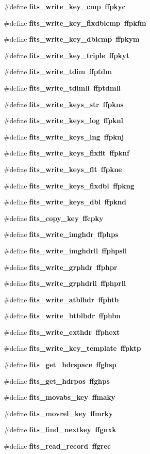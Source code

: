 \begin{CompactItemize}
\#define \bf{fits\_\-write\_\-key\_\-cmp}~ffpkyc
\item 
\#define \bf{fits\_\-write\_\-key\_\-fixdblcmp}~ffpkfm
\item 
\#define \bf{fits\_\-write\_\-key\_\-dblcmp}~ffpkym
\item 
\#define \bf{fits\_\-write\_\-key\_\-triple}~ffpkyt
\item 
\#define \bf{fits\_\-write\_\-tdim}~ffptdm
\item 
\#define \bf{fits\_\-write\_\-tdimll}~ffptdmll
\item 
\#define \bf{fits\_\-write\_\-keys\_\-str}~ffpkns
\item 
\#define \bf{fits\_\-write\_\-keys\_\-log}~ffpknl
\item 
\#define \bf{fits\_\-write\_\-keys\_\-lng}~ffpknj
\item 
\#define \bf{fits\_\-write\_\-keys\_\-fixflt}~ffpknf
\item 
\#define \bf{fits\_\-write\_\-keys\_\-flt}~ffpkne
\item 
\#define \bf{fits\_\-write\_\-keys\_\-fixdbl}~ffpkng
\item 
\#define \bf{fits\_\-write\_\-keys\_\-dbl}~ffpknd
\item 
\#define \bf{fits\_\-copy\_\-key}~ffcpky
\item 
\#define \bf{fits\_\-write\_\-imghdr}~ffphps
\item 
\#define \bf{fits\_\-write\_\-imghdrll}~ffphpsll
\item 
\#define \bf{fits\_\-write\_\-grphdr}~ffphpr
\item 
\#define \bf{fits\_\-write\_\-grphdrll}~ffphprll
\item 
\#define \bf{fits\_\-write\_\-atblhdr}~ffphtb
\item 
\#define \bf{fits\_\-write\_\-btblhdr}~ffphbn
\item 
\#define \bf{fits\_\-write\_\-exthdr}~ffphext
\item 
\#define \bf{fits\_\-write\_\-key\_\-template}~ffpktp
\item 
\#define \bf{fits\_\-get\_\-hdrspace}~ffghsp
\item 
\#define \bf{fits\_\-get\_\-hdrpos}~ffghps
\item 
\#define \bf{fits\_\-movabs\_\-key}~ffmaky
\item 
\#define \bf{fits\_\-movrel\_\-key}~ffmrky
\item 
\#define \bf{fits\_\-find\_\-nextkey}~ffgnxk
\item 
\#define \bf{fits\_\-read\_\-record}~ffgrec

\end{CompactItemize}
